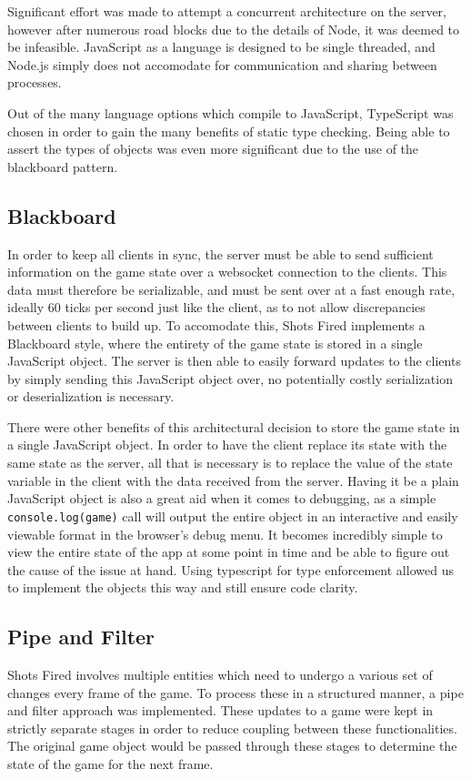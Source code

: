 \documentclass[12pt]{report}
\begin{document}
Significant effort was made to attempt a concurrent architecture on the server,
however after numerous road blocks due to the details of Node, it was deemed
to be infeasible.  JavaScript as a language is designed to be single threaded,
and Node.js simply does not accomodate for communication and sharing between
processes.

Out of the many language options which compile to JavaScript, TypeScript was
chosen in order to gain the many benefits of static type checking.  Being able
to assert the types of objects was even more significant due to the use of the
blackboard pattern. 

\subsection{Blackboard}
In order to keep all clients in sync, the server must be able to send
sufficient information on the game state over a websocket connection to the
clients.  This data must therefore be serializable, and must be sent over at a fast
enough rate, ideally 60 ticks per second just like the client, as to not allow
discrepancies between clients to build up.  To accomodate this, Shots Fired
implements a Blackboard style, where the entirety of the game state is stored in
a single JavaScript object.  The server is then able to easily forward updates
to the clients by simply sending this JavaScript object over, no potentially
costly serialization or deserialization is necessary.

There were other benefits of this architectural decision to store the game state in a
single JavaScript object.  In order to have the client replace its state with
the same state as the server, all that is necessary is to replace the value of
the state variable in the client with the data received from the server.  Having
it be a plain JavaScript object is also a great aid when it comes to debugging,
as a simple \texttt{console.log(game)} call will output the entire object in an
interactive and easily viewable format in the browser's debug menu.  It becomes
incredibly simple to view the entire state of the app at some point in time and
be able to figure out the cause of the issue at hand. Using typescript for type enforcement
allowed us to implement the objects this way and still ensure code clarity. 

\subsection{Pipe and Filter}
Shots Fired involves multiple entities which need to undergo a various set of
changes every frame of the game.  To process these in a structured manner, a
pipe and filter approach was implemented.  These updates to a game were kept
in strictly separate stages in order to reduce coupling between these
functionalities.  The original game object would be passed through these stages
to determine the state of the game for the next frame.
\end{document}
